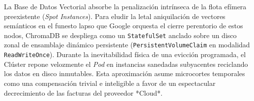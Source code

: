 La Base de Datos Vectorial absorbe la penalización intrínseca de la flota efímera preexistente (\textit{Spot Instances}). Para eludir la letal aniquilación de vectores semánticos en el funesto lapso que Google orquesta el cierre perentorio de estos nodos, ChromaDB se despliega como un \texttt{StatefulSet} anclado sobre un disco zonal de ensamblaje dinámico persistente (\texttt{PersistentVolumeClaim} en modalidad \texttt{ReadWriteOnce}). 
Durante la inevitabilidad física de una evicción programada, el Clúster repone velozmente el \textit{Pod} en instancias sanedadas subyacentes reciclando los datos en disco inmutables. Esta aproximación asume microcortes temporales como una compensación trivial e inteligible a favor de un espectacular decrecimiento de las facturas del proveedor *Cloud*.
